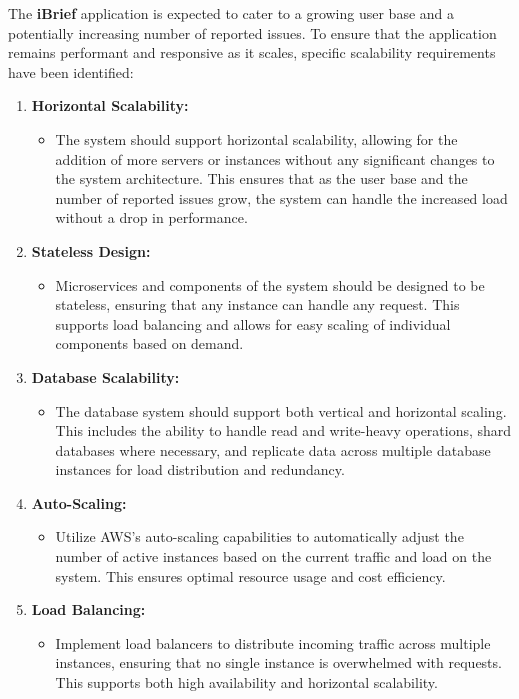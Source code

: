 The \textbf{iBrief} application is expected to cater to a growing user base and a potentially increasing number of reported issues. To ensure that the application remains performant and responsive as it scales, specific scalability requirements have been identified:

\begin{enumerate}
    \item \textbf{Horizontal Scalability:} 
    \begin{itemize}
        \item The system should support horizontal scalability, allowing for the addition of more servers or instances without any significant changes to the system architecture. This ensures that as the user base and the number of reported issues grow, the system can handle the increased load without a drop in performance.
    \end{itemize}
    
    \item \textbf{Stateless Design:}
    \begin{itemize}
        \item \gls{Microservices} and components of the system should be designed to be stateless, ensuring that any instance can handle any request. This supports \gls{load balancing} and allows for easy scaling of individual components based on demand.
    \end{itemize}
    
    \item \textbf{Database Scalability:}
    \begin{itemize}
        \item The database system should support both vertical and horizontal scaling. This includes the ability to handle read and write-heavy operations, shard databases where necessary, and replicate data across multiple database instances for load distribution and redundancy.
    \end{itemize}
    
    \item \textbf{Auto-Scaling:}
    \begin{itemize}
        \item Utilize AWS's auto-scaling capabilities to automatically adjust the number of active instances based on the current traffic and load on the system. This ensures optimal resource usage and cost efficiency.
    \end{itemize}
    
    \item \textbf{Load Balancing:}
    \begin{itemize}
        \item Implement load balancers to distribute incoming traffic across multiple instances, ensuring that no single instance is overwhelmed with requests. This supports both high availability and horizontal scalability.
    \end{itemize}
    

\end{enumerate}
